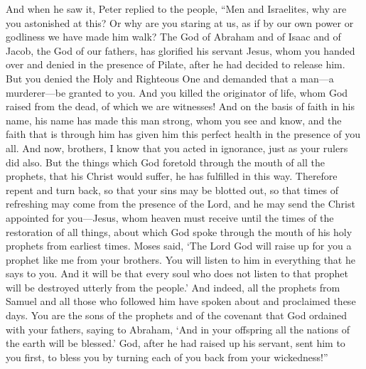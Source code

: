 \begin{biblechapter}
\verse And when he saw it, Peter replied to the people, “Men and Israelites, why are you astonished at this? Or why are you staring at us, as if by our own power or godliness we have made him walk?
\verse The God of Abraham and of Isaac and of Jacob, the God of our fathers, has glorified his servant Jesus, whom you handed over and denied in the presence of Pilate, after he had decided to release him.
\verse But you denied the Holy and Righteous One and demanded that a man—a murderer—be granted to you.
\verse And you killed the originator of life, whom God raised from the dead, of which we are witnesses!
\verse And on the basis of faith in his name, his name has made this man strong, whom you see and know, and the faith that is through him has given him this perfect health in the presence of you all.
\verse And now, brothers, I know that you acted in ignorance, just as your rulers did also.
\verse But the things which God foretold through the mouth of all the prophets, that his Christ would suffer, he has fulfilled in this way.
\verse Therefore repent and turn back, so that your sins may be blotted out,
\verse so that times of refreshing may come from the presence of the Lord, and he may send the Christ appointed for you—Jesus,
\verse whom heaven must receive until the times of the restoration of all things, about which God spoke through the mouth of his holy prophets from earliest times.
\verse Moses said, ‘The Lord God will raise up for you a prophet like me from your brothers. You will listen to him in everything that he says to you.
\verse And it will be that every soul who does not listen to that prophet will be destroyed utterly from the people.’
\verse And indeed, all the prophets from Samuel and all those who followed him have spoken about and proclaimed these days.
\verse You are the sons of the prophets and of the covenant that God ordained with your fathers, saying to Abraham, ‘And in your offspring all the nations of the earth will be blessed.’
\verse God, after he had raised up his servant, sent him to you first, to bless you by turning each of you back from your wickedness!”
\end{biblechapter}

